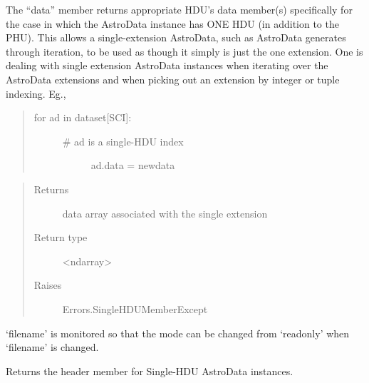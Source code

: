 \documentclass[letterpaper,10pt,english]{sphinxmanual}
\begin{document}
\begin{fulllineitems}
\begin{fulllineitems}
The ``data'' member returns appropriate HDU's data member(s) specifically
for the case in which the AstroData instance has ONE HDU (in 
addition to the PHU). This allows a single-extension AstroData, 
such as AstroData generates through iteration, to be used as though 
it simply is just the one extension. One is dealing with single 
extension AstroData instances when iterating over the AstroData 
extensions  and when picking out an extension by integer or tuple 
indexing. 
Eg.,
\begin{quote}
\begin{description}
\item[{for ad in dataset{[}SCI{]}:}] \leavevmode\begin{description}
\item[{\# ad is a single-HDU index}] \leavevmode
ad.data = newdata

\end{description}

\end{description}
\end{quote}
\begin{quote}\begin{description}
\item[{Returns}] \leavevmode
data array associated with the single extension

\item[{Return type}] \leavevmode
\textless{}ndarray\textgreater{}

\item[{Raises }] \leavevmode
Errors.SingleHDUMemberExcept

\end{description}\end{quote}

\end{fulllineitems}


\begin{fulllineitems}
\label{astro_class:astrodata.AstroData.AstroData.filename}
`filename' is monitored so that the mode can be changed 
from `readonly' when `filename' is changed.

\end{fulllineitems}


\begin{fulllineitems}
\label{astro_class:astrodata.AstroData.AstroData.header}
Returns the header member for Single-HDU AstroData instances.


\end{fulllineitems}
\end{fulllineitems}
\end{document}
